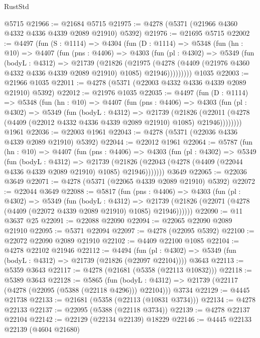 \begin{lexlean}{RustStd}
\begin{coremodule}
{\begin{coremodule}
{{{{{{{{{{{{{{{{{{{{{{{{{{{{{{{{{{{    @5715
@21966 := @21684 @5715
@21975 := @4278 (@5371 (@21966 @4360 @4332 @4336 @4339 @2089 @21910) @5392)
@21976 := @21695 @5715
@22002 := @4497
    (fun (S : @1114) =>
    @4304
      (fun (D : @1114) =>
      @5348
        (fun (hn : @10) =>
        @4407
          (fun (pns : @4406) =>
          @4303
            (fun (pl : @4302) =>
            @5349
              (fun (bodyL : @4312) =>
              @21739
                (@21826
                  (@21975
                    (@4278
                      (@4409 (@21976 @4360 @4332 @4336 @4339 @2089 @21910) @1085)
                      @21946)))))))))
    @1035
@22003 := @21966 @1035
@22011 := @4278 (@5371 (@22003 @4332 @4336 @4339 @2089 @21910) @5392)
@22012 := @21976 @1035
@22035 := @4497
    (fun (D : @1114) =>
    @5348
      (fun (hn : @10) =>
      @4407
        (fun (pns : @4406) =>
        @4303
          (fun (pl : @4302) =>
          @5349
            (fun (bodyL : @4312) =>
            @21739
              (@21826
                (@22011 (@4278 (@4409 (@22012 @4332 @4336 @4339 @2089 @21910) @1085) @21946))))))))
    @1961
@22036 := @22003 @1961
@22043 := @4278 (@5371 (@22036 @4336 @4339 @2089 @21910) @5392)
@22044 := @22012 @1961
@22064 := @5787
    (fun (hn : @10) =>
    @4407
      (fun (pns : @4406) =>
      @4303
        (fun (pl : @4302) =>
        @5349
          (fun (bodyL : @4312) =>
          @21739
            (@21826 (@22043 (@4278 (@4409 (@22044 @4336 @4339 @2089 @21910) @1085) @21946)))))))
    @3649
@22065 := @22036 @3649
@22071 := @4278 (@5371 (@22065 @4339 @2089 @21910) @5392)
@22072 := @22044 @3649
@22088 := @5817
    (fun (pns : @4406) =>
    @4303
      (fun (pl : @4302) =>
      @5349
        (fun (bodyL : @4312) =>
        @21739 (@21826 (@22071 (@4278 (@4409 (@22072 @4339 @2089 @21910) @1085) @21946))))))
@22090 := @11 @3637 @25
@22091 := @22088 @22090
@22094 := @22065 @22090 @2089 @21910
@22095 := @5371 @22094
@22097 := @4278 (@22095 @5392)
@22100 := @22072 @22090 @2089 @21910
@22102 := @4409 @22100 @1085
@22104 := @4278 @22102 @21946
@22112 := @4494
    (fun (pl : @4302) => @5349 (fun (bodyL : @4312) => @21739 (@21826 (@22097 @22104))))
    @3643
@22113 := @5359 @3643
@22117 := @4278 (@21681 (@5358 (@22113 @10832)))
@22118 := @5389 @3643
@22128 := @5865
    (fun (bodyL : @4312) => @21739 (@22117 (@4278 (@22095 (@5388 (@22118 @4296))) @22104)))
    @3734
@22129 := @4445 @21738
@22133 := @21681 (@5358 (@22113 (@10831 @3734)))
@22134 := @4278 @22133
@22137 := @22095 (@5388 (@22118 @3734))
@22139 := @4278 @22137 @22104
@22142 := @22129 (@22134 @22139) @18229
@22146 := @4445 @22133 @22139 (@4604 @21680)
}}}}}}}}}}}}}}}}}}}}}}}}}}}}}}}}}}}
\end{coremodule}}
\end{coremodule}
\end{lexlean}
